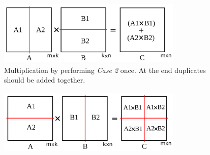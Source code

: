 \begin{figure}[thb]
    \includegraphics[width=8.8cm,height=3.1cm]{./figures/skinny001.pdf}
    \caption{Multiplication by performing \textit{Case 2} once. At the end duplicates should be added together.}
    \label{fig:skinny1}
\end{figure}

\begin{figure}[thb]
    \includegraphics[width=8.8cm,height=3.1cm]{./figures/skinny002.pdf}
    \caption{}
    \label{fig:skinny2}
\end{figure}

\fi


